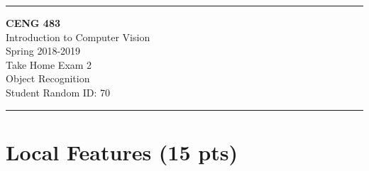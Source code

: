 \documentclass[12pt]{article}
\newcommand{\HRule}{\rule{\linewidth}{1mm}}
\begin{document}
\noindent
\HRule %
\small
\begin{center}
	\LARGE \textbf{CENG 483} \\[4mm]
	\Large Introduction to Computer Vision \\[4mm]
	\normalsize Spring 2018-2019 \\
	\Large Take Home Exam 2 \\
	\Large Object Recognition \\
    \Large Student Random ID: 70 \\
\end{center}
\HRule

\begin{center}
\end{center}
\vspace{-10mm}

\section{Local Features (15 pts)}
\end{document}
